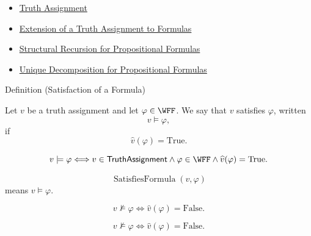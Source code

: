\begin{dependencies}
\begin{itemize}
  \item \hyperref[def:truth-assignment-propositional-logic]{Truth Assignment}
  \item \hyperref[def:extended-truth-assignment-propositional-logic]{Extension of a Truth Assignment to Formulas}
  \item \hyperref[thm:structural-recursion-propositional-formulas]{Structural Recursion for Propositional Formulas}
  \item \hyperref[thm:unique-decomposition-propositional-formulas]{Unique Decomposition for Propositional Formulas}
\end{itemize}
\end{dependencies}
\begin{definitionbox}{Definition (Satisfaction of a Formula)}
\begin{definition}
\label{def:satisfaction-propositional-formula}
Let \(v\) be a truth assignment and let \(\varphi\in\WFF\). We say that \(v\) satisfies \(\varphi\), written
\[
v\models\varphi,
\]
if
\[
\widehat v(\varphi)=\mathrm{True}.
\]
\end{definition}
\end{definitionbox}

\begin{remark*}
\[
v\models\varphi
\Longleftrightarrow
v\in\mathsf{TruthAssignment}
\land
\varphi\in\WFF
\land
\widehat v(\varphi)=\mathrm{True}.
\]
\end{remark*}

\begin{remark*}
\[
\operatorname{SatisfiesFormula}(v,\varphi)
\]
means \(v\models\varphi\).
\end{remark*}

\begin{remark*}
\[
v\not\models\varphi
\Longleftrightarrow
\widehat v(\varphi)=\mathrm{False}.
\]
\end{remark*}

\begin{remark*}
\[
v\not\models\varphi
\Longleftrightarrow
\widehat v(\varphi)=\mathrm{False}.
\]
\end{remark*}

